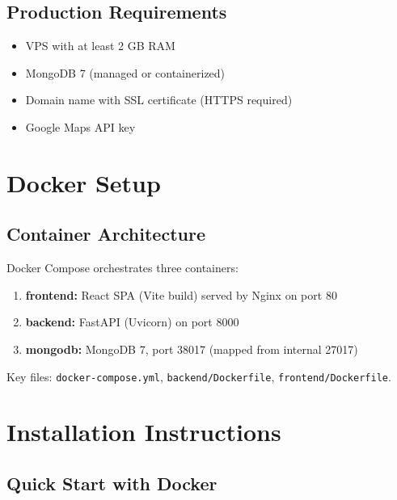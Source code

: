 \documentclass[10pt,a4paper]{report}
\begin{document}
\subsection{Production Requirements}

\begin{itemize}
    \item VPS with at least 2 GB RAM
    \item MongoDB 7 (managed or containerized)
    \item Domain name with SSL certificate (HTTPS required)
    \item Google Maps API key
\end{itemize}

\section{Docker Setup}

\subsection{Container Architecture}

Docker Compose orchestrates three containers:

\begin{enumerate}
    \item \textbf{frontend:} React SPA (Vite build) served by Nginx on port 80
    \item \textbf{backend:} FastAPI (Uvicorn) on port 8000
    \item \textbf{mongodb:} MongoDB 7, port 38017 (mapped from internal 27017)
\end{enumerate}

Key files: \texttt{docker-compose.yml}, \texttt{backend/Dockerfile}, \texttt{frontend/Dockerfile}.

\section{Installation Instructions}

\subsection{Quick Start with Docker}
\end{document}
